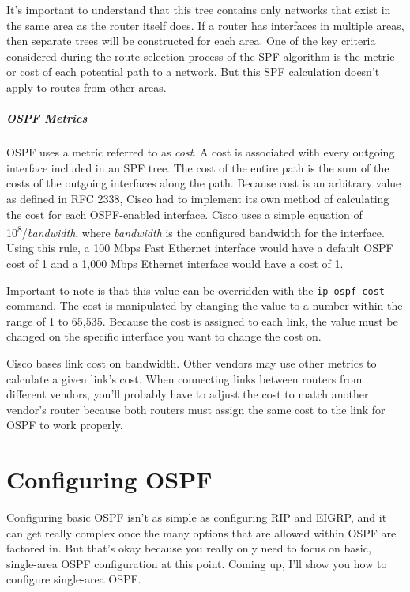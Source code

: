 It's important to understand that this tree contains only networks that
exist in the same area as the router itself does. If a router has
interfaces in multiple areas, then separate trees will be constructed
for each area. One of the key criteria considered during the route
selection process of the SPF algorithm is the metric or cost of each
potential path to a network. But this SPF calculation doesn't apply to
routes from other areas.

\subparagraph[OSPF
Metrics]{\texorpdfstring{\protect\hypertarget{c18.xhtmlux5cux23c18-sec-4}{}{}\protect\hypertarget{c18.xhtmlux5cux23Page_753}{}{}OSPF
Metrics}{OSPF Metrics}}

OSPF uses a metric referred to as \emph{cost}. A cost is associated with
every outgoing interface included in an SPF tree. The cost of the entire
path is the sum of the costs of the outgoing interfaces along the path.
Because cost is an arbitrary value as defined in RFC 2338, Cisco had to
implement its own method of calculating the cost for each OSPF-enabled
interface. Cisco uses a simple equation of
10\textsuperscript{8}/\emph{bandwidth}, where \emph{bandwidth} is the
configured bandwidth for the interface. Using this rule, a 100 Mbps Fast
Ethernet interface would have a default OSPF cost of 1 and a 1,000 Mbps
Ethernet interface would have a cost of 1.

Important to note is that this value can be overridden with the
\texttt{ip\ ospf\ cost} command. The cost is manipulated by changing the
value to a number within the range of 1 to 65,535. Because the cost is
assigned to each link, the value must be changed on the specific
interface you want to change the cost on.

\begin{note}
Cisco bases link cost on bandwidth.
Other vendors may use other metrics to calculate a given link's cost.
When connecting links between routers from different vendors, you'll probably have to adjust the cost to match another vendor's router
because both routers must assign the same cost to the link for OSPF to work properly.
\end{note}



\section{Configuring OSPF}

Configuring basic OSPF isn't as simple as configuring RIP and EIGRP, and
it can get really complex once the many options that are allowed within
OSPF are factored in. But that's okay because you really only need to
focus on basic, single-area OSPF configuration at this point. Coming up,
I'll show you how to configure single-area OSPF.

